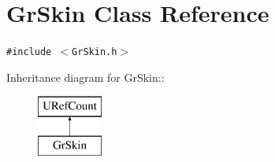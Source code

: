 \hypertarget{class_gr_skin}{
\section{GrSkin Class Reference}
\label{class_gr_skin}
}
{\tt \#include $<$GrSkin.h$>$}

Inheritance diagram for GrSkin::\begin{figure}[H]
\begin{center}
\leavevmode
\includegraphics[height=2cm]{class_gr_skin}
\end{center}
\end{figure}
